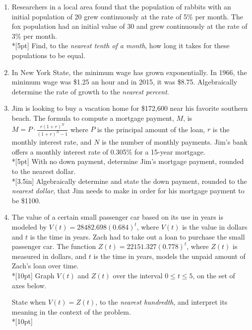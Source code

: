 \documentclass[12pt, twoside]{article}
\begin{document}
\begin{enumerate}
\item Researchers in a local area found that the population of rabbits with an initial population of 20 grew continuously at the rate of 5\% per month. The fox population had an initial value of 30 and grew continuously at the rate of 3\% per month.\\*[5pt]
Find, to the \emph{nearest tenth of a month}, how long it takes for these populations to be equal. %

\newpage
\item In New York State, the minimum wage has grown exponentially. In 1966, the minimum wage was \$1.25 an hour and in 2015, it was \$8.75. Algebraically determine the rate of growth to the \emph{nearest percent}.

\item Jim is looking to buy a vacation home for \$172,600 near his favorite southern beach. The formula to compute a mortgage payment, $M$, is $\displaystyle M=P \cdot \frac{r(1+r)^N}{(1+r)^N-1}$ where $P$ is the principal amount of the loan, $r$ is the monthly interest rate, and $N$ is the number of monthly payments. Jim’s bank offers a monthly interest rate of 0.305\% for a 15-year mortgage.\\*[5pt]
With no down payment, determine Jim’s mortgage payment, rounded to the nearest dollar.\\*[3.5in]
Algebraically determine and state the down payment, rounded to the \emph{nearest dollar}, that Jim needs to make in order for his mortgage payment to be \$1100.

\newpage
\item The value of a certain small passenger car based on its use in years is modeled by $V(t) =28482.698(0.684)^t$, where $V(t)$ is the value in dollars and $t$ is the time in years. Zach had to take out a loan to purchase the small passenger car. The function $Z(t)=22151.327(0.778)^t$, where $Z(t)$ is measured in dollars, and $t$ is the time in years, models the unpaid amount of Zach’s loan over time.\\*[10pt]
Graph $V(t)$ and $Z(t)$ over the interval $0 \leq t \leq 5$, on the set of axes below.
\begin{center}
\end{center}
State when $V(t)=Z(t)$, to the \emph{nearest hundredth}, and interpret its meaning in the context of the problem.\\*[10pt]


\end{enumerate}
\end{document}
